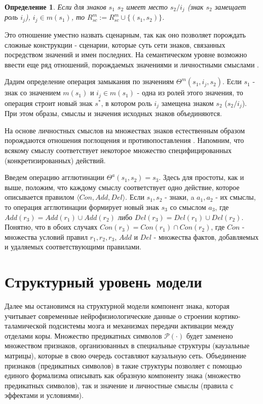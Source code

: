 \documentclass[12pt]{scrartcl}
\newtheorem{definition}{Определение}
\begin{document}
	\begin{definition}
		Если для знаков $s_1$ $s_2$ имеет место $s_2 / i_j$	(знак $s_2$ замещает роль $i_j$), $i_j\in m(s_1)$, то $R^m_{sc}:=R^m_{sc}\cup\{(s_1,s_2)\}$.
	\end{definition}
	
	Это отношение уместно назвать сценарным, так как оно позволяет порождать сложные конструкции -  сценарии, которые суть сети знаков, связанных посредством значений и имен последних. На семантическом уровне возможно ввести еще ряд отношений, порождаемых значениями и личностными смыслами \cite{Osipov2014c}.
	
	Дадим определение операция замыкания по значениям $\Theta^m(s_1,i_j,s_2)$. Если $s_1$ - знак со значением $m(s_1)$ и $i_j\in m(s_1)$ - одна из ролей этого значения, то операция строит новый знак $s^*$, в котором роль $i_j$ замещена знаком $s_2$ ($s_2/i_j$). При этом образы, смыслы и значения исходных знаков объединяются.
	
	На основе личностных смыслов на множествах знаков естественным образом порождаются отношения поглощения и противопоставления \cite{Osipov2014c}. Напомним, что всякому смыслу соответствует некоторое множество специфицированных (конкретизированных) действий. 

	Введем операцию агглютинации $\Theta^a(s_1,s_2)=s_3$. Здесь для простоты, как и выше, положим, что каждому смыслу соответствует одно действие, которое описывается правилом $\langle Con, Add, Del \rangle$. Если $s_1,s_2$ - знаки, a $a_1,a_2$ - их смыслы, то операция агглютинации формирует	новый знак $s_3$ со смыслом $a_3$, где $Add(r_3)=Add(r_1)\cup Add(r_2)$ либо $Del(r_3)=Del(r_1)\cup Del(r_2)$. Понятно, что в обоих случаях $Con(r_3)=Con(r_1)\cap Con(r_2)$, где $Con$ - множества условий правил $r_1,r_2,r_3$, $Add$ и $Del$ - множества фактов, добавляемых и удаляемых соответствующими правилами.
		
	
	\section{Структурный уровень модели}\label{sec:structure}
	
	Далее мы остановимся на структурной модели компонент знака, которая учитывает современные нейрофизиологические данные о строении кортико-таламической подсистемы мозга и механизмах передачи активации между отделами коры. Множество предикатных символов $\mathcal P(\cdot)$ будет заменено множеством признаков, организованных в специальные структуры (каузальные матрицы), которые в свою очередь составляют каузальную сеть. Объединение признаков (предикатных символов) в такие структуры позволяет с помощью единого формализма описывать как образную компоненту знака (множество предикатных символов), так и значение и личностные смыслы (правила с эффектами и условиями).
	
\end{document}
